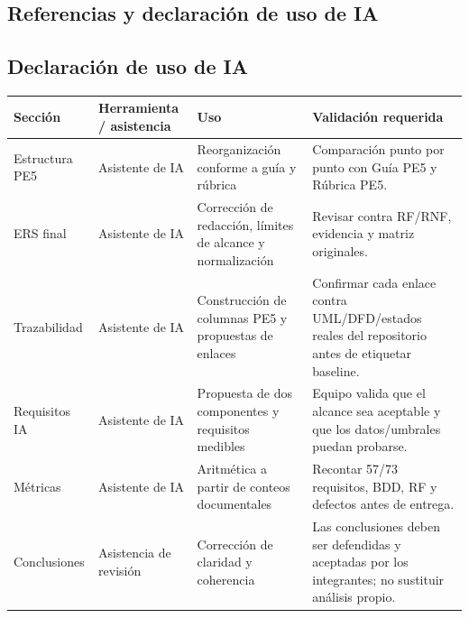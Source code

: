\documentclass[11pt,a4paper]{article}
\begin{document}
\begin{appendices}
		\section{Referencias y declaración de uso de IA}
		\subsection{Declaración de uso de IA}
		\begin{longtable}{p{3cm}p{3.2cm}p{3.8cm}p{4.5cm}}\toprule\textbf{Sección}&\textbf{Herramienta / asistencia}&\textbf{Uso}&\textbf{Validación requerida}\\\midrule\endhead
			Estructura PE5&Asistente de IA&Reorganización conforme a guía y rúbrica&Comparación punto por punto con Guía PE5 y Rúbrica PE5.\\
			ERS final&Asistente de IA&Corrección de redacción, límites de alcance y normalización&Revisar contra RF/RNF, evidencia y matriz originales.\\
			Trazabilidad&Asistente de IA&Construcción de columnas PE5 y propuestas de enlaces&Confirmar cada enlace contra UML/DFD/estados reales del repositorio antes de etiquetar baseline.\\
			Requisitos IA&Asistente de IA&Propuesta de dos componentes y requisitos medibles&Equipo valida que el alcance sea aceptable y que los datos/umbrales puedan probarse.\\
			Métricas&Asistente de IA&Aritmética a partir de conteos documentales&Recontar 57/73 requisitos, BDD, RF y defectos antes de entrega.\\
			Conclusiones&Asistencia de revisión&Corrección de claridad y coherencia&Las conclusiones deben ser defendidas y aceptadas por los integrantes; no sustituir análisis propio.\\\bottomrule\end{longtable}
		
\end{appendices}
\end{document}
